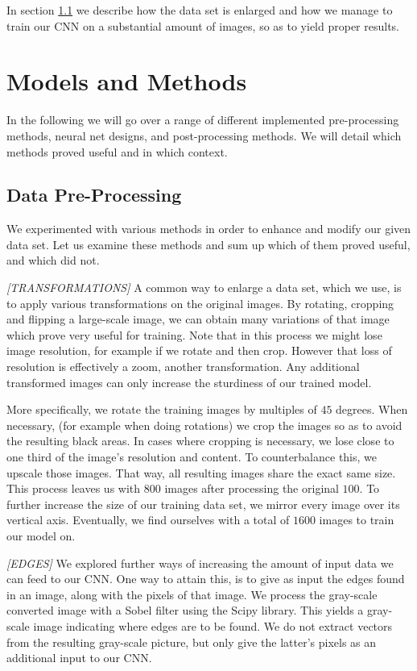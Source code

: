 \documentclass[10pt,conference,compsocconf]{IEEEtran}
\begin{document}
In section \ref{ssec:data_proc} we describe how the data set is enlarged and how we manage to train our CNN on a substantial amount of images, so as to yield proper results.


\section{Models and Methods}
\label{sec:methods}

In the following we will go over a range of different implemented pre-processing methods, neural net designs, and post-processing methods. We will detail which methods proved useful and in which context.

\subsection{Data Pre-Processing} 
\label{ssec:data_proc}

We experimented with various methods in order to enhance and modify our given data set. Let us examine these methods and sum up which of them proved useful, and which did not.

\smallskip
\textit{[TRANSFORMATIONS]}   
A common way to enlarge a data set, which we use, is to apply various transformations on the original images. By rotating, cropping and flipping a large-scale image, we can obtain many variations of that image which prove very useful for training. Note that in this process we might lose image resolution, for example if we rotate and then crop. However that loss of resolution is effectively a zoom, another transformation. Any additional transformed images can only increase the sturdiness of our trained model. 

More specifically, we rotate the training images by multiples of $45$ degrees. When necessary, (for example when doing rotations) we crop the images so as to avoid the resulting black areas. In cases where cropping is necessary, we lose close to one third of the image's resolution and content. To counterbalance this, we upscale those images. That way, all resulting images share the exact same size. This process leaves us with $800$ images after processing the original $100$. To further increase the size of our training data set, we mirror every image over its vertical axis. Eventually, we find ourselves with a total of $1600$ images to train our model on.

\smallskip
\textit{[EDGES]}   
We explored further ways of increasing the amount of input data we can feed to our CNN. One way to attain this, is to give as input the edges found in an image, along with the pixels of that image. We process the gray-scale converted image with a Sobel filter using the Scipy library. This yields a gray-scale image indicating where edges are to be found. We do not extract vectors from the resulting gray-scale picture, but only give the latter's pixels as an additional input to our CNN.
\end{document}
